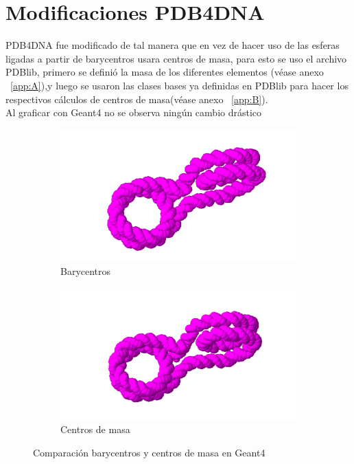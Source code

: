 
\clearpage

\section{Modificaciones PDB4DNA}
\label{sec:MODIFI}
PDB4DNA fue modificado de tal manera que en vez de hacer uso de las esferas ligadas a partir de barycentros usara centros de masa, para esto se uso el archivo PDBlib, primero se definió la masa de los diferentes elementos (véase anexo ~\ref{app:A}),y luego se usaron las clases bases ya definidas en PDBlib para hacer los respectivos cálculos de centros de masa(véase anexo ~\ref{app:B}).\\
Al graficar con Geant4 no se observa ningún cambio drástico


\begin{figure}
\centering
\begin{subfigure}{.6\textwidth}
  \centering
  \includegraphics[width=.7\linewidth]{./Figures/a.png}
  \caption{Barycentros}
  \label{fig:sub1}
\end{subfigure}%
\begin{subfigure}{.5\textwidth}
  \centering
  \includegraphics[width=.7\linewidth]{./Figures/b.png}
  \caption{Centros de masa}
  \label{fig:sub2}
\end{subfigure}
\caption{Comparación barycentros y centros de masa en Geant4}
\label{fig:test}
\end{figure}


